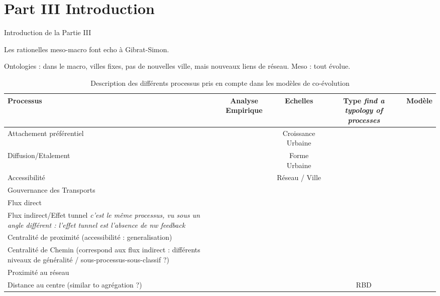 



\chapter*{Part III Introduction}{Introduction de la Partie III}








Les rationelles meso-macro font echo à Gibrat-Simon.

Ontologies : dans le macro, villes fixes, pas de nouvelles ville, mais nouveaux liens de réseau. Meso : tout évolue.







\begin{table}
\begin{tabular}[6pt]{m{4cm}|c|c|c|c}
Processus & Analyse Empirique & Echelles & Type \textit{find a typology of processes} & Modèle \\\hline
Attachement préférentiel & & Croissance Urbaine & & \\\hline
Diffusion/Etalement & & Forme Urbaine & &\\\hline
Accessibilité  & & Réseau / Ville & & \\\hline
Gouvernance des Transports & & & &\\\hline
Flux direct  & & & &\\\hline
Flux indirect/Effet tunnel \textit{c'est le même processus, vu sous un angle différent : l'effet tunnel est l'absence de nw feedback} & & & &\\\hline
Centralité de proximité (accessibilité : generalisation) & & & &\\\hline
Centralité de Chemin (correspond aux flux indirect : différents niveaux de généralité / sous-processus-sous-classif ?) & & & &\\\hline
Proximité au réseau & & & &\\\hline
Distance au centre (similar to agrégation ?) & & & RBD &\\\hline
\end{tabular}
\caption{Description des différents processus pris en compte dans les modèles de co-évolution}{}
\end{table}


